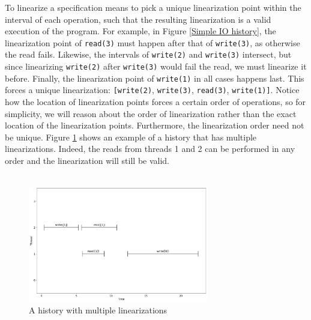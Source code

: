 \documentclass[oneside, a4paper, onecolumn, 10pt]{article}
\begin{document}
To linearize a specification means to pick a unique linearization point within the interval of each operation, such that the resulting linearization is a valid execution of the program. For example, in Figure \ref{Simple IO history}, the linearization point of \verb|read(3)| must happen after that of \verb|write(3)|, as otherwise the read fails. Likewise, the intervals of \verb|write(2)| and \verb|write(3)| intersect, but since linearizing \verb|write(2)| after \verb|write(3)| would fail the read, we must linearize it before. Finally, the linearization point of \verb|write(1)| in all cases happens last. This forces a unique linearization: \verb|[write(2)|, \verb|write(3)|, \verb|read(3)|, \verb|write(1)]|. Notice how the location of linearization points forces a certain order of operations, so for simplicity, we will reason about the order of linearization rather than the exact location of the linearization points. Furthermore, the linearization order need not be unique. Figure \ref{Multiple Linearizations} shows an example of a history that has multiple linearizations. Indeed, the reads from threads 1 and 2 can be performed in any order and the linearization will still be valid.\\\\

\begin{figure}
  \centering
  \includegraphics[width=0.7\textwidth]{assets/io_mult_lins.png}
  
  \caption{\label{Multiple Linearizations}A history with multiple linearizations}
  
\end{figure}
\end{document}

